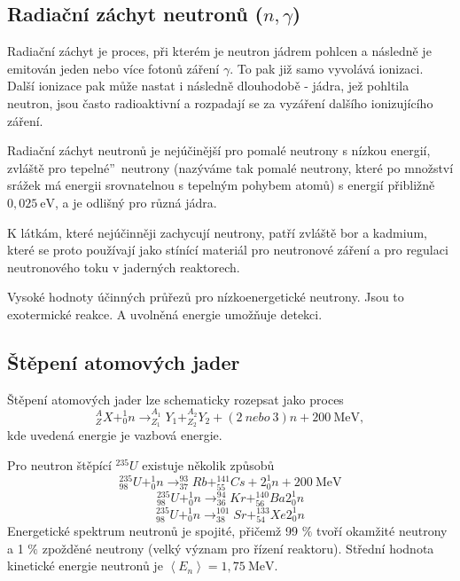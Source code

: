 \documentclass[../../main.tex]{subfiles}
\begin{document}
\subsection{Radiační záchyt neutronů ($n, \gamma$)}

Radiační záchyt je proces, při kterém je neutron jádrem pohlcen a následně je emitován jeden nebo více fotonů záření $\gamma$. To pak již samo vyvolává ionizaci. Další ionizace pak může nastat i následně dlouhodobě - jádra, jež pohltila neutron, jsou často radioaktivní a rozpadají se za vyzáření dalšího ionizujícího záření.

Radiační záchyt neutronů je nejúčinější pro pomalé neutrony s nízkou energií, zvláště pro \quotedblbase tepelné\textquotedblright ~neutrony (nazýváme tak pomalé neutrony, které po množství srážek má energii srovnatelnou s tepelným pohybem atomů) s energií přibližně $0,025 ~\mathrm{eV}$, a je odlišný pro různá jádra.

K látkám, které nejúčinněji zachycují neutrony, patří zvláště bor a kadmium, které se proto používají jako stínící materiál pro neutronové záření a pro regulaci neutronového toku v jaderných reaktorech.

Vysoké hodnoty účinných průřezů pro nízkoenergetické neutrony. Jsou to exotermické reakce. A uvolněná energie umožňuje detekci.

\subsection{Štěpení atomových jader}

Štěpení atomových jader lze schematicky rozepsat jako proces
\begin{equation}
^{A}_{Z}X + ^{1}_{0}n \rightarrow ^{A_1}_{Z_1}Y_1 + ^{A_2}_{Z_2}Y_2 + (2 ~ nebo ~ 3)n + 200 ~\mathrm{MeV},
\end{equation}
kde uvedená energie je vazbová energie.

Pro neutron štěpící $^{235}U$ existuje několik způsobů
\begin{equation}
^{235}_{98}U + ^{1}_{0}n \rightarrow ^{93}_{37}Rb + ^{141}_{55}Cs + 2 ^{1}_{0}n + 200 ~\mathrm{MeV}
\end{equation}
\begin{equation}
^{235}_{98}U + ^{1}_{0}n \rightarrow ^{94}_{36}Kr + ^{140}_{56}Ba 2 ^{1}_{0}n
\end{equation}
\begin{equation}
^{235}_{98}U + ^{1}_{0}n \rightarrow ^{101}_{38}Sr + ^{133}_{54}Xe  2 ^{1}_{0}n
\end{equation}
Energetické spektrum neutronů je spojité, přičemž 99 $\%$ tvoří okamžité neutrony a 1 $\%$ zpožděné neutrony (velký význam pro řízení reaktoru). Střední hodnota kinetické energie neutronů je $\left\langle E_n\right\rangle  = 1,75 ~\mathrm{MeV}$.
\end{document}
